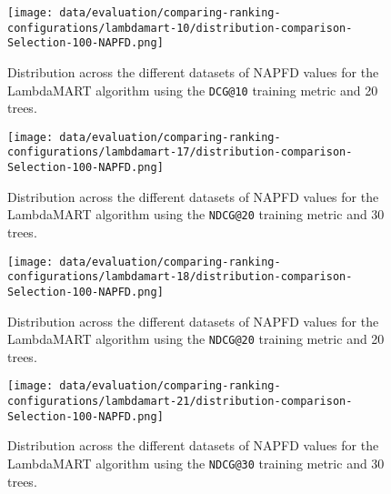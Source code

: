 \begin{figure}
    \centering
    \begin{minipage}{.45\textwidth}
        \centering
        \texttt{[image: data/evaluation/comparing-ranking-configurations/lambdamart-10/distribution-comparison-Selection-100-NAPFD.png]}
        \parbox{0.9\textwidth}{
            \caption{Distribution across the different datasets of NAPFD values for the LambdaMART algorithm using the \texttt{DCG@10} training metric and 20 trees.}
        \label{fig:lambdamart-10-napfd}
            }
    \end{minipage}%
    \begin{minipage}{.45\textwidth}
        \centering
        \texttt{[image: data/evaluation/comparing-ranking-configurations/lambdamart-17/distribution-comparison-Selection-100-NAPFD.png]}
        \parbox{0.9\textwidth}{
            \caption{Distribution across the different datasets of NAPFD values for the LambdaMART algorithm using the \texttt{NDCG@20} training metric and 30 trees.}
        \label{fig:lambdamart-17-napfd}
            }
    \end{minipage}%
\end{figure}

\begin{figure}
    \centering
    \begin{minipage}{.45\textwidth}
        \centering
        \texttt{[image: data/evaluation/comparing-ranking-configurations/lambdamart-18/distribution-comparison-Selection-100-NAPFD.png]}
        \parbox{0.9\textwidth}{
            \caption{Distribution across the different datasets of NAPFD values for the LambdaMART algorithm using the \texttt{NDCG@20} training metric and 20 trees.}
        \label{fig:lambdamart-18-napfd}
            }
    \end{minipage}%
    \begin{minipage}{.45\textwidth}
        \centering
        \texttt{[image: data/evaluation/comparing-ranking-configurations/lambdamart-21/distribution-comparison-Selection-100-NAPFD.png]}
        \parbox{0.9\textwidth}{
            \caption{Distribution across the different datasets of NAPFD values for the LambdaMART algorithm using the \texttt{NDCG@30} training metric and 30 trees.}
        \label{fig:lambdamart-21-napfd}
            }
    \end{minipage}%
\end{figure}

